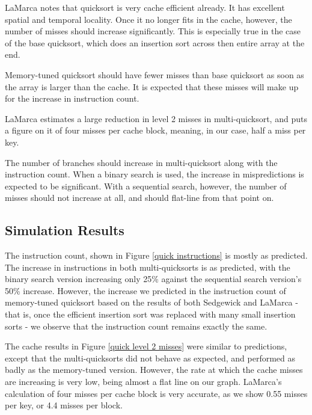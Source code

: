 LaMarca notes that quicksort is very cache efficient already. It has excellent
spatial and temporal locality. Once it no longer fits in the cache, however, the
number of misses should increase significantly. This is especially true in the
case of the base quicksort, which does an insertion sort across then entire
array at the end.

Memory-tuned quicksort should have fewer misses than base quicksort as soon as
the array is larger than the cache. It is expected that these misses will make
up for the increase in instruction count.

LaMarca estimates a large reduction in level 2 misses in multi-quicksort, and
puts a figure on it of four misses per cache block, meaning, in our case, half a
miss per key.

The number of branches should increase in multi-quicksort along with the
instruction count. When a binary search is used, the increase in mispredictions
is expected to be significant. With a sequential search, however, the number of
misses should not increase at all, and should flat-line from that point on.

\subsection{Simulation Results}


The instruction count, shown in Figure \ref{quick instructions} is mostly as
predicted. The increase in instructions in both multi-quicksorts is as
predicted, with the binary search version increasing only 25\% against the
sequential search version's 50\% increase. However, the increase we predicted in
the instruction count of memory-tuned quicksort based on the results of both Sedgewick
and LaMarca -  that is, once the efficient insertion sort was replaced with many
small insertion sorts - we observe that the instruction count remains exactly
the same.


The cache results in Figure \ref{quick level 2 misses} were similar to
predictions, except that the multi-quicksorts did not behave as expected, and
performed as badly as the memory-tuned version. However, the rate at which the
cache misses are increasing is very low, being almost a flat line on our graph.
LaMarca's calculation of four misses per cache block is very accurate, as we
show 0.55 misses per key, or 4.4 misses per block.

